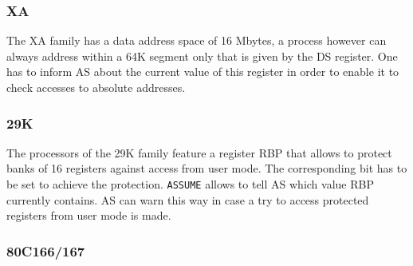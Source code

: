 \documentclass[12pt,twoside]{report}
\newcommand{\tty}[1]{{\tt #1}}
\newcommand{\asname}{{AS}}
\begin{document}

\subsubsection{XA}

The XA family has a data address space of 16 Mbytes, a process however
can always address within a 64K segment only that is given by the DS
register.  One has to inform \asname{} about the current value of this
register in order to enable it to check accesses to absolute
addresses.


\subsubsection{29K}

The processors of the 29K family feature a register RBP that allows
to protect banks of 16 registers against access from user mode.  The
corresponding bit has to be set to achieve the protection.  \tty{ASSUME}
allows to tell \asname{} which value RBP currently contains.  \asname{} can warn
this way in case a try to access protected registers from user mode
is made.


\subsubsection{80C166/167}
\end{document}
